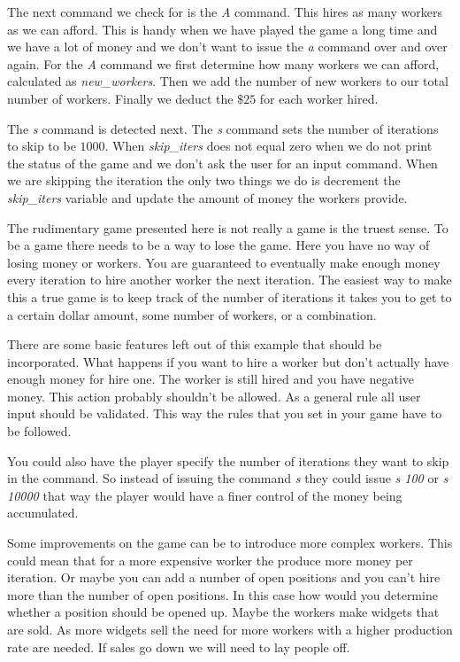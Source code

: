 The next command we check for is the \emph{A} command. This hires as many workers as we can afford. This is handy when we have played the game a long time and we have a lot of money and we don't want to issue the \emph{a} command over and over again. For the \emph{A} command we first determine how many workers we can afford, calculated as \emph{new\_workers}. Then we add the number of new workers to our total number of workers. Finally we deduct the $\$25$ for each worker hired. 

The \emph{s} command is detected next. The \emph{s} command sets the number of iterations to skip to be $1000$. When \emph{skip\_iters} does not equal zero when we do not print the status of the game and we don't ask the user for an input command. When we are skipping the iteration the only two things we do is decrement the \emph{skip\_iters} variable and update the amount of money the workers provide. 



The rudimentary game presented here is not really a game is the truest sense. To be a game there needs to be a way to lose the game. Here you have no way of losing money or workers. You are guaranteed to eventually make enough money every iteration to hire another worker the next iteration. The easiest way to make this a true game is to keep track of the number of iterations it takes you to get to a certain dollar amount, some number of workers, or a combination. 

There are some basic features left out of this example that should be incorporated. What happens if you want to hire a worker but don't actually have enough money for hire one. The worker is still hired and you have negative money. This action probably shouldn't be allowed. As a general rule all user input should be validated. This way the rules that you set in your game have to be followed. 

You could also have the player specify the number of iterations they want to skip in the command. So instead of issuing the command \emph{s} they could issue \emph{s 100} or \emph{s 10000} that way the player would have a finer control of the money being accumulated. 

Some improvements on the game can be to introduce more complex workers. This could mean that for a more expensive worker the produce more money per iteration. Or maybe you can add a number of open positions and you can't hire more than the number of open positions. In this case how would you determine whether a position should be opened up. Maybe the workers make widgets that are sold. As more widgets sell the need for more workers with a higher production rate are needed. If sales go down we will need to lay people off. 

